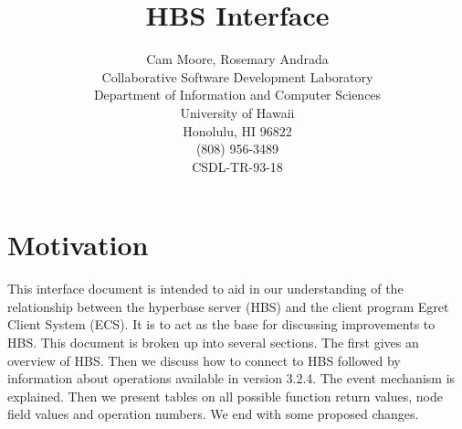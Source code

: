 




\title{HBS Interface} 
\author {Cam Moore, Rosemary Andrada\\
Collaborative Software Development Laboratory\\ 
Department of Information and Computer Sciences\\
University of Hawaii\\
Honolulu, HI 96822\\
(808) 956-3489\\
CSDL-TR-93-18}

\maketitle

\tableofcontents

\newpage 
\section{Motivation}
\label{sec:motivation}

This interface document is intended to aid in our understanding of the
relationship between the hyperbase server (HBS) and the client program
Egret Client System (ECS).  It is to act as the base for discussing
improvements to HBS.  This document is broken up into several sections.
The first gives an overview of HBS.  Then we discuss how to connect to HBS
followed by information about operations available in version 3.2.4.  The
event mechanism is explained.  Then we present tables on all possible
function return values, node field values and operation numbers. We end
with some proposed changes.

